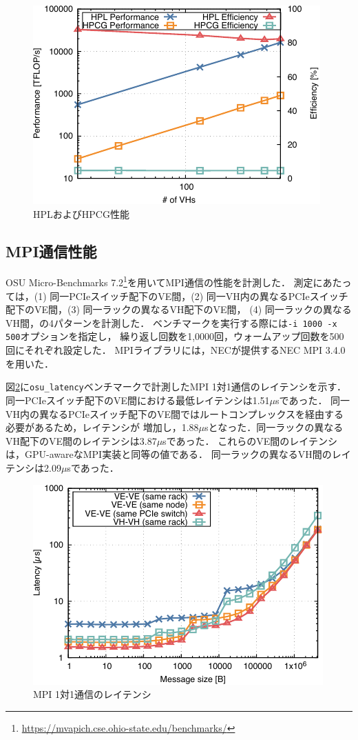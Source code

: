 ﻿\documentclass[submit,techrep,noauthor]{ipsj}
\begin{document}
\begin{figure}[tb]
  \centering
  \includegraphics{figs/hpl_hpcg.pdf}
  \caption{HPLおよびHPCG性能}\label{fig:hpl-hpcg}
\end{figure}

\subsection{MPI通信性能}\label{sec:mpi}

OSU Micro-Benchmarks
7.2\footnote{\url{https://mvapich.cse.ohio-state.edu/benchmarks/}}を用いてMPI通信の性能を計測した．
測定にあたっては，(1) 同一PCIeスイッチ配下のVE間，(2)
同一VH内の異なるPCIeスイッチ配下のVE間，(3) 同一ラックの異なるVH配下のVE間，
(4) 同一ラックの異なるVH間，の4パターンを計測した．
ベンチマークを実行する際には\verb|-i 1000 -x 500|オプションを指定し，
繰り返し回数を1,0000回，ウォームアップ回数を500回にそれぞれ設定した．
MPIライブラリには，NECが提供するNEC MPI 3.4.0を用いた．

図\ref{fig:mpi-lat}に\verb|osu_latency|ベンチマークで計測したMPI 1対1通信のレイテンシを示す．
同一PCIeスイッチ配下のVE間における最低レイテンシは1.51$\mu$sであった．
同一VH内の異なるPCIeスイッチ配下のVE間ではルートコンプレックスを経由する必要があるため，レイテンシが
増加し，1.88$\mu$sとなった．同一ラックの異なるVH配下のVE間のレイテンシは3.87$\mu$sであった．
これらのVE間のレイテンシは，GPU-awareなMPI実装\cite{Shafie2021,Shafie2022}と同等の値である．
同一ラックの異なるVH間のレイテンシは2.09$\mu$sであった．

\begin{figure}[tb]
  \centering
  \includegraphics{figs/mpi_latency.pdf}
  \caption{MPI 1対1通信のレイテンシ}\label{fig:mpi-lat}
\end{figure}
\end{document}
